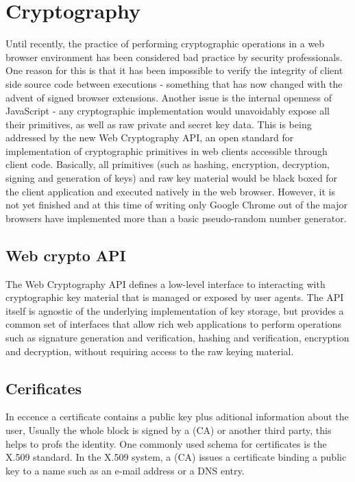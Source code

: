\section{Cryptography}
Until recently, the practice of performing cryptographic operations in a web browser environment has been considered bad practice by security professionals\cite{Matasano:Online}. One reason for this is that it has been impossible to verify the integrity of client side source code between executions - something that has now changed with the advent of signed browser extensions. Another issue is the internal openness of JavaScript - any cryptographic implementation would unavoidably expose all their primitives, as well as raw private and secret key data. This is being addressed by the new Web Cryptography API\cite{WebCrypto:Online}, an open standard for implementation of cryptographic primitives in web clients accessible through client code. Basically, all primitives (such as hashing, encryption, decryption, signing and generation of keys) and raw key material would be black boxed for the client application and executed natively in the web browser. However, it is not yet finished and at this time of writing only Google Chrome out of the major browsers have implemented more than a basic pseudo-random number generator.
\subsection{Web crypto API}
The Web Cryptography API defines a low-level interface to interacting with cryptographic key material that is managed or exposed by user agents. The API itself is agnostic of the underlying implementation of key storage, but provides a common set of interfaces that allow rich web applications to perform operations such as signature generation and verification, hashing and verification, encryption and decryption, without requiring access to the raw keying material.
\subsection{Cerificates} %
In eccence a certificate contains a public key plus aditional information about the user,
Usually the whole block is signed by a (CA) or another third party, this helps to profs the identity. One commonly used schema for certificates is the X.509 standard.
In the X.509 system, a (CA) issues a certificate binding a public key to a name such as an e-mail address or a DNS entry.

